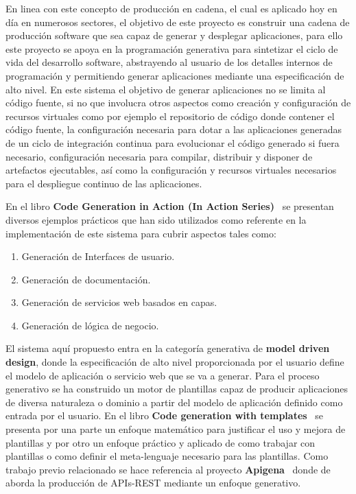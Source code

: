 \documentclass[a4paper,11pt]{book}
\begin{document}
En linea con este concepto de producción en cadena, el cual es aplicado hoy en día en numerosos sectores, el objetivo de este proyecto es construir una cadena de producción software que sea capaz de generar y desplegar aplicaciones, para ello este proyecto se apoya en la programación generativa para sintetizar el ciclo de vida del desarrollo software, abstrayendo al usuario de los detalles internos de programación y permitiendo generar aplicaciones mediante una especificación de alto nivel. En este sistema el objetivo  de generar aplicaciones no se limita al código fuente, si no que involucra otros aspectos como creación y configuración de recursos virtuales como por ejemplo el repositorio de código donde contener el código fuente, la configuración necesaria para dotar a las aplicaciones generadas de un ciclo de integración continua para evolucionar el código generado si fuera necesario, configuración necesaria para compilar, distribuir y disponer de artefactos ejecutables, así como  la configuración y recursos virtuales necesarios para el despliegue continuo de las aplicaciones.
 
En el libro \textbf{Code Generation in Action (In Action Series)}~\cite{codeg} se presentan diversos ejemplos prácticos que han sido utilizados como referente en la implementación de este sistema para cubrir aspectos tales como:

\begin{enumerate}
\item Generación de Interfaces de usuario. 
\item Generación de documentación.
\item Generación de servicios web basados en capas.
\item Generación de lógica de negocio. 
\end{enumerate}


El sistema aquí propuesto entra en la categoría generativa de \textbf{model driven design}, donde la especificación de alto nivel proporcionada por el usuario define el modelo de aplicación o servicio web  que se va a generar. Para el proceso generativo se ha construido un motor de plantillas capaz de producir aplicaciones de diversa naturaleza o dominio a partir del modelo de aplicación definido como entrada por el usuario.  En el libro \textbf{Code generation with templates}~\cite{templates} se presenta por una parte un enfoque matemático para justificar el uso y mejora de plantillas y por otro un enfoque práctico y aplicado de como trabajar con plantillas o como definir el meta-lenguaje necesario para las plantillas.  Como trabajo previo relacionado se hace referencia al proyecto \textbf{Apigena}~\cite{apigena} donde de aborda la producción de APIs-REST mediante un enfoque generativo. 
\end{document}
